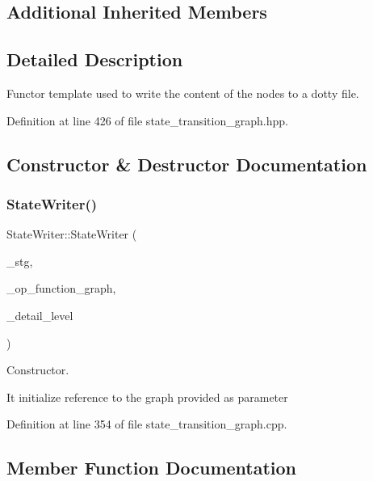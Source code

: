 \subsection*{Additional Inherited Members}


\subsection{Detailed Description}
Functor template used to write the content of the nodes to a dotty file. 

Definition at line 426 of file state\+\_\+transition\+\_\+graph.\+hpp.



\subsection{Constructor \& Destructor Documentation}
\mbox{\label{classStateWriter_a7295924318382f7d3cce1691a4b01165}} 
\subsubsection{\texorpdfstring{State\+Writer()}{StateWriter()}}
{\footnotesize\ttfamily State\+Writer\+::\+State\+Writer (\begin{DoxyParamCaption}\item[{const \hyperlink{structgraph}{graph} $\ast$}]{\+\_\+stg,  }\item[{const \hyperlink{op__graph_8hpp_a9a0b240622c47584bee6951a6f5de746}{Op\+Graph\+Const\+Ref}}]{\+\_\+op\+\_\+function\+\_\+graph,  }\item[{int}]{\+\_\+detail\+\_\+level }\end{DoxyParamCaption})}



Constructor. 

It initialize reference to the graph provided as parameter 

Definition at line 354 of file state\+\_\+transition\+\_\+graph.\+cpp.



\subsection{Member Function Documentation}
\mbox{\label{classStateWriter_a2c861e031d9bba75843879f2c9dd098f}} 
